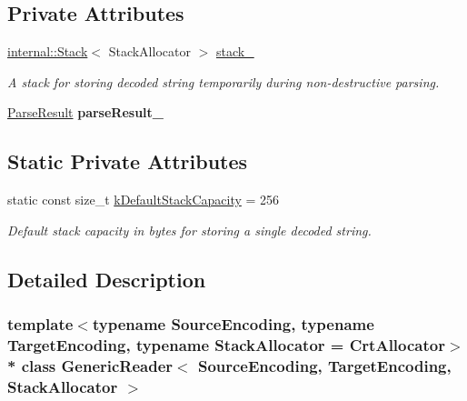 \subsection*{Private Attributes}
\begin{DoxyCompactItemize}
\item 
\hyperlink{classinternal_1_1_stack}{internal\+::\+Stack}$<$ Stack\+Allocator $>$ \hyperlink{class_generic_reader_a7c04f4aa27561d358376920d06b78cdb}{stack\+\_\+}\hypertarget{class_generic_reader_a7c04f4aa27561d358376920d06b78cdb}{}\label{class_generic_reader_a7c04f4aa27561d358376920d06b78cdb}

\begin{DoxyCompactList}\small\item\em A stack for storing decoded string temporarily during non-\/destructive parsing. \end{DoxyCompactList}\item 
\hyperlink{struct_parse_result}{Parse\+Result} {\bfseries parse\+Result\+\_\+}\hypertarget{class_generic_reader_a156018c2805bfa730287314ee9d9257d}{}\label{class_generic_reader_a156018c2805bfa730287314ee9d9257d}

\end{DoxyCompactItemize}
\subsection*{Static Private Attributes}
\begin{DoxyCompactItemize}
\item 
static const size\+\_\+t \hyperlink{class_generic_reader_ac507ea8672bf2b5d01b35583c0597f15}{k\+Default\+Stack\+Capacity} = 256\hypertarget{class_generic_reader_ac507ea8672bf2b5d01b35583c0597f15}{}\label{class_generic_reader_ac507ea8672bf2b5d01b35583c0597f15}

\begin{DoxyCompactList}\small\item\em Default stack capacity in bytes for storing a single decoded string. \end{DoxyCompactList}\end{DoxyCompactItemize}


\subsection{Detailed Description}
\subsubsection*{template$<$typename Source\+Encoding, typename Target\+Encoding, typename Stack\+Allocator = Crt\+Allocator$>$\\*
class Generic\+Reader$<$ Source\+Encoding, Target\+Encoding, Stack\+Allocator $>$}

